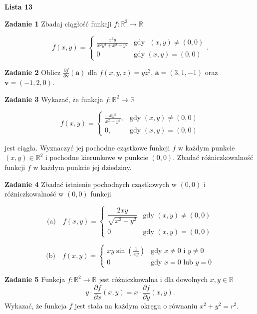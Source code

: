\documentclass[a4paper,11pt]{article}
\newcommand{\RR}{\mathbb{R}}
\begin{document}
\begin{center}
  {\large\textbf{Lista 13}}
\end{center}

\hrulefill

\textbf{Zadanie 1} Zbadaj ciągłość funkcji $f: \mathbb{R}^2 \to
\mathbb{R}$

\[
  f(x,y) = 
  \begin{cases}
    \frac{x^2y}{x^2 y^2 + x^2 + y^2} & \text{gdy ~} (x,y) \neq
    (0,0)\\
    0 & \text{gdy~} (x,y) = (0,0)
  \end{cases}
.\] 

\textbf{Zadanie 2} Oblicz $\frac{\partial f}{\partial \bm{v}}(\bm{a})$
dla $f(x,y,z) = y z^2$, $\bm{a} = (3,1,-1)$ oraz  $\bm{v} = (-1,2,0)$.

\textbf{Zadanie 3} Wykazać, że funkcja $f: \mathbb{R}^2 \to \mathbb{R}$

\[
  f(x,y) =
  \begin{cases}
    \frac{xy^2}{x^2 + y^2}, & \text{gdy~} (x,y) \neq (0,0) \\
    0, & \text{gdy~} (x,y) = (0,0)
  \end{cases}
\] 

jest ciągła. Wyznaczyć jej pochodne cząstkowe funkcji $f$ w każdym
punkcie $(x, y) \in \mathbb{R}^2$ i pochodne kierunkowe w punkcie $(0,
0)$. Zbadać różniczkowalność funkcji $f$ w każdym punkcie jej dziedziny.

\textbf{Zadanie 4} Zbadać istnienie pochodnych cząstkowych w $(0,0)$ i
różniczkowalność w $(0,0)$ funkcji 

$$
\text{(a)}
\quad
f(x,y)
=
\begin{cases}
  \dfrac{2x y}{\sqrt{x^2 + y^2}} & \text{gdy } (x,y) \neq
  (0,0) \\ 
0 & \text{gdy } (x,y) = (0,0) \end{cases} 
$$

$$\text{(b)} \quad 
f(x,y) = 
\begin{cases} 
  x y \sin(\frac{1}{x y})& \text{gdy } x \neq 0
  \text{ i } y\neq 0 \\ 
  0 & \text{gdy } x=0 \text{ lub } y=0 
\end{cases} 
$$

\textbf{Zadanie 5} Funkcja $f: \RR^2 \to \RR$ jest różniczkowalna i dla
dowolnych $x,y \in \RR$ 
$$ y \cdot \frac{\partial f}{\partial x}(x,y) = x
\cdot \frac{\partial f}{\partial y}(x,y). $$ 
Wykazać, że funkcja $f$ jest stała na każdym okręgu o równaniu $x^2 +y^2
= r^2$.
\end{document}
